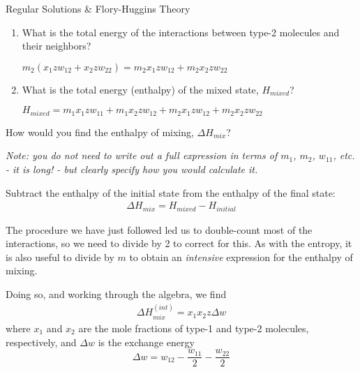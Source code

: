 \begin{activity}{Regular Solutions \& Flory-Huggins Theory}
\begin{ctqs}
\begin{enumerate}
			\item What is the total energy of the interactions between type-2 molecules and their neighbors?
			
				\begin{solution}[1.25in]
					$m_2(x_1 z w_{12} + x_2 z w_{22}) = m_2 x_1 z w_{12} + m_2 x_2 z w_{22}$
				\end{solution}
				
			\item What is the total energy (enthalpy) of the mixed state, $H_{mixed}$?
			
				\begin{solution}[1.25in]
				
					$H_{mixed} = m_1 x_1 z w_{11} + m_1 x_2 z w_{12} + m_2 x_1 z w_{12} + m_2 x_2 z w_{22}$
				
				\end{solution}
				
		\end{enumerate}
		
	\question How would you find the enthalpy of mixing, $\Delta H_{mix}$?
	
		\emph{Note: you do not need to write out a full expression in terms of $m_1$, $m_2$, $w_{11}$, etc. - it is long! - but clearly specify how you would calculate it.}
	
		\begin{solution}[1.25in]
		
			Subtract the enthalpy of the initial state from the enthalpy of the final state:
			\begin{align*}
				\Delta H_{mix} = H_{mixed} - H_{initial}
			\end{align*}
		
		\end{solution}
		
\end{ctqs}

\begin{infobox}
The procedure we have just followed led us to double-count most of the interactions, so we need to divide by 2 to correct for this.  As with the entropy, it is also useful to divide by $m$ to obtain an \emph{intensive} expression for the enthalpy of mixing.
	
		Doing so, and working through the algebra, we find
		\begin{align*}
			\Delta H_{mix}^{(int)} %
					= x_1 x_2 z \Delta w
		\end{align*}
		where $x_1$ and $x_2$ are the mole fractions of type-1 and type-2 molecules, respectively, and $\Delta w$ is the exchange energy
		\begin{equation*}
			\Delta w = w_{12} - \frac{w_{11}}{2} - \frac{w_{22}}{2}
		\end{equation*}
\end{infobox}


\end{activity}
